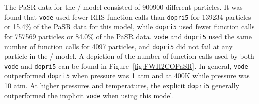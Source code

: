 \documentclass[12pt]{ussci}
\begin{document}
The PaSR data for the \slash {} model consisted of 900900 different particles.
It was found that \texttt{vode} used fewer RHS function calls than \texttt{dopri5} for 139234 particles or 15.4\% of the PaSR data for this model, while \texttt{dopri5} used fewer function calls for 757569 particles or 84.0\% of the PaSR data.
\texttt{vode} and \texttt{dopri5} used the same number of function calls for 4097 particles, and \texttt{dopri5} did not fail at any particle in the \slash {} model.
A depiction of the number of function calls used by both \texttt{vode} and \texttt{dopri5} can be found in Figure~\ref{fig:FWH2COPaSR}.
In general, \texttt{vode} outperformed \texttt{dopri5} when pressure was 1 atm and at 400K while pressure was 10 atm.
At higher pressures and temperatures, the explicit \texttt{dopri5} generally outperformed the implicit \texttt{vode} when using this model.
\end{document}
